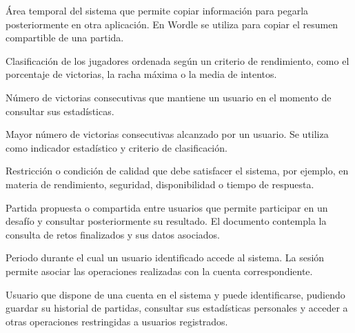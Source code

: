 \documentclass[a4paper,11pt]{article}
\begin{document}
\begin{description}[style=nextline,leftmargin=3.5cm,labelwidth=3.2cm]
    \item[Portapapeles]
    Área temporal del sistema que permite copiar información para pegarla posteriormente en otra aplicación. En Wordle se utiliza para copiar el resumen compartible de una partida.

    \item[Ranking]
    Clasificación de los jugadores ordenada según un criterio de rendimiento, como el porcentaje de victorias, la racha máxima o la media de intentos.

    \item[Racha actual]
    Número de victorias consecutivas que mantiene un usuario en el momento de consultar sus estadísticas.

    \item[Racha máxima]
    Mayor número de victorias consecutivas alcanzado por un usuario. Se utiliza como indicador estadístico y criterio de clasificación.

    \item[Requisito no funcional]
    Restricción o condición de calidad que debe satisfacer el sistema, por ejemplo, en materia de rendimiento, seguridad, disponibilidad o tiempo de respuesta.

    \item[Reto]
    Partida propuesta o compartida entre usuarios que permite participar en un desafío y consultar posteriormente su resultado. El documento contempla la consulta de retos finalizados y sus datos asociados.

    \item[Sesión]
    Periodo durante el cual un usuario identificado accede al sistema. La sesión permite asociar las operaciones realizadas con la cuenta correspondiente.

    \item[Usuario registrado]
    Usuario que dispone de una cuenta en el sistema y puede identificarse, pudiendo guardar su historial de partidas, consultar sus estadísticas personales y acceder a otras operaciones restringidas a usuarios registrados.

\end{description}
\end{document}
